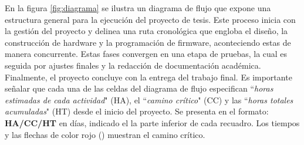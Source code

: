 %

%
%
%

%

En la figura \ref{fig:diagrama} se ilustra un diagrama de flujo que expone una estructura general para la ejecución del proyecto de tesis. Este proceso inicia con la gestión del proyecto y delinea una ruta cronológica que engloba el diseño, la construcción de hardware y la programación de firmware, aconteciendo estas de manera concurrente. Estas fases convergen en una etapa de pruebas, la cual es seguida por ajustes finales y la redacción de documentación académica. Finalmente, el proyecto concluye con la entrega del trabajo final. Es importante señalar que cada una de las celdas del diagrama de flujo especifican ``\textit{horas estimadas de cada actividad}" (HA), el ``\textit{camino crítico}" (CC) y las ``\textit{horas totales acumuladas}" (HT) desde el inicio del proyecto. Se presenta en el formato: \textbf{HA/{\color{red}CC}/HT} en días, indicado el la parte inferior de cada recuadro. Los tiempos y las flechas de color rojo ({\color{red}\faArrowDown})  muestran el camino crítico.



